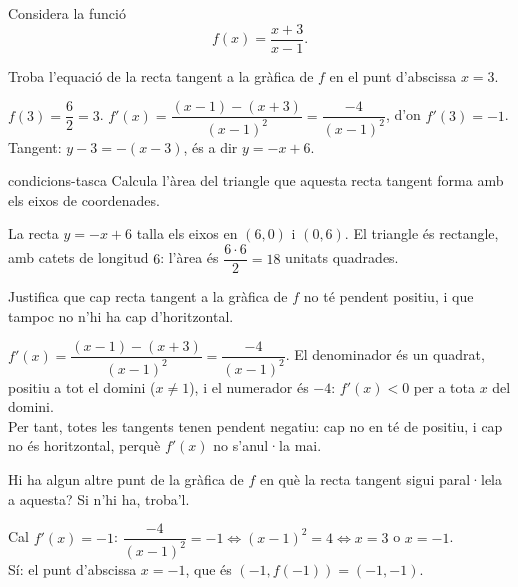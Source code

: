 Considera la funció
\[
f(x)=\frac{x+3}{x-1} .
\]

\begin{apartats}

Troba l'equació de la recta tangent a la gràfica de $f$ en el punt d'abscissa $x=3$.

\begin{solucio}
$f(3)=\dfrac{6}{2}=3$. $f'(x)=\dfrac{(x-1)-(x+3)}{(x-1)^2}=\dfrac{-4}{(x-1)^2}$, d'on
$f'(3)=-1$.\\
Tangent: $y-3=-(x-3)$, és a dir $y=-x+6$.
\end{solucio}

\begin{tria}{condicions-tasca}
Calcula l'àrea del triangle que aquesta recta tangent forma amb els eixos de coordenades.

\begin{solucio}
La recta $y=-x+6$ talla els eixos en $(6,0)$ i $(0,6)$. El triangle és rectangle, amb catets
de longitud $6$: l'àrea és $\dfrac{6\cdot6}{2}=\boxed{18}$ unitats quadrades.
\end{solucio}

Justifica que cap recta tangent a la gràfica de $f$ no té pendent positiu, i que tampoc no n'hi ha
cap d'horitzontal.

\begin{solucio}
$f'(x)=\dfrac{(x-1)-(x+3)}{(x-1)^2}=\dfrac{-4}{(x-1)^2}$. El denominador és un quadrat, positiu a
tot el domini ($x\ne1$), i el numerador és $-4$: $f'(x)<0$ per a tota $x$ del domini.\\
Per tant, totes les tangents tenen pendent negatiu: cap no en té de positiu, i cap no és
horitzontal, perquè $f'(x)$ no s'anul·la mai.
\end{solucio}
\end{tria}

\begin{nomesllarg}
Hi ha algun altre punt de la gràfica de $f$ en què la recta tangent sigui paral·lela a
aquesta? Si n'hi ha, troba'l.

\begin{solucio}
Cal $f'(x)=-1$: $\dfrac{-4}{(x-1)^2}=-1\iff(x-1)^2=4\iff x=3$ o $x=-1$.\\
Sí: el punt d'abscissa $x=-1$, que és $\left(-1,f(-1)\right)=(-1,-1)$.
\end{solucio}
\end{nomesllarg}

\end{apartats}
